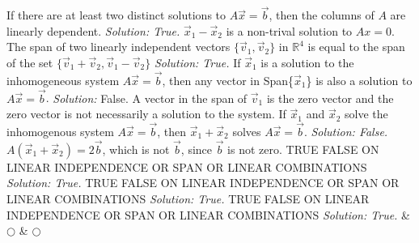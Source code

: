 \fi     
\ifnum {}
   If there are at least two distinct solutions to $A\vec x = \vec b$, then the columns of $A$ are linearly dependent. 
    \ifnum {} {\color{DarkBlue} \textit{Solution: True. }  
    $\vec x_1 - \vec x_2$ is a non-trival solution to $A x=0$.} \fi
\fi     
\ifnum {}
    The span of two linearly independent vectors $\{\vec v_1, \vec v_2\} $ in $\mathbb R^4$  is equal to the span of the set $\{\vec v_1 + \vec v_2, \vec v_1 - \vec v_2 \}$
    \ifnum {} {\color{DarkBlue} \textit{Solution: True.} 
    } \fi
\fi     
\ifnum {}
    If $\vec x_1$ is a solution to the inhomogeneous system $A\vec x = \vec b$, then any vector in Span\{$\vec x_1$\} is also a solution to $A\vec x = \vec b$.
    \ifnum {} {\color{DarkBlue} \textit{Solution:  } False. A vector in the span of $\vec v_1$ is the zero vector and the zero vector is not necessarily a solution to the system. } \fi
\fi     
\ifnum {}
     If $ \vec x_1$ and $\vec x_2$ solve the inhomogenous system $A\vec x = \vec b$, then $\vec x_1 + \vec x_2$ solves $A \vec x = \vec b$. 
    \ifnum {} {\color{DarkBlue} \textit{Solution: False.} 
    $A(\vec x_1 + \vec x_2)=2\vec b $, which is not $\vec b$, since $\vec b$ is not zero. } \fi
\fi     
\ifnum {}
    TRUE FALSE ON LINEAR INDEPENDENCE OR SPAN OR LINEAR COMBINATIONS
    \ifnum {} {\color{DarkBlue} \textit{Solution: True. }  
    } \fi
\fi     
\ifnum {}
    TRUE FALSE ON LINEAR INDEPENDENCE OR SPAN OR LINEAR COMBINATIONS
    \ifnum {} {\color{DarkBlue} \textit{Solution: True. }  
    } \fi
\fi     
\ifnum {}
    TRUE FALSE ON LINEAR INDEPENDENCE OR SPAN OR LINEAR COMBINATIONS
    \ifnum {} {\color{DarkBlue} \textit{Solution: True. }  
    } \fi
\fi     
& $\bigcirc$  & $\bigcirc$ \\ 
